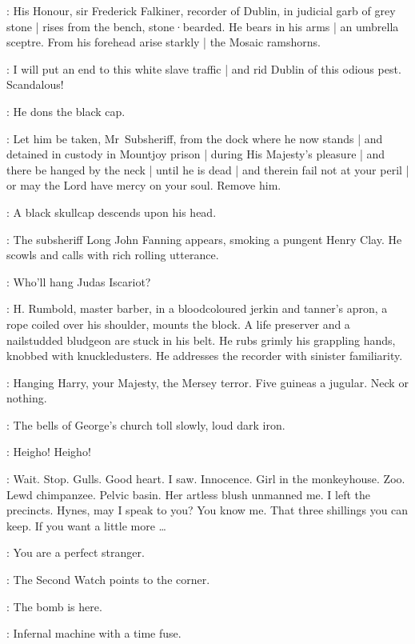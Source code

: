 :
His Honour,
sir Frederick Falkiner,
recorder of Dublin,
in judicial garb of grey stone |
rises from the bench,
stone·bearded.
He bears in his arms |
an umbrella sceptre.
From his forehead arise starkly |
the Mosaic ramshorns.

\Recorder:
I will put an end to this white slave traffic |
and rid Dublin of this odious pest.
Scandalous!

:
He dons the black cap.

\Recorder:
Let him be taken,
Mr~Subsheriff,
from the dock where he now stands |
and detained in custody in Mountjoy prison |
during His Majesty's pleasure |
and there be hanged by the neck |
until he is dead |
and therein fail not at your peril |
or may the Lord have mercy on your soul.
Remove him.

:
A black skullcap descends upon his head.

:
The subsheriff Long John Fanning appears,
smoking a pungent Henry Clay.
He scowls and calls with rich rolling utterance.

\LongJohn:
Who'll hang Judas Iscariot?

:
H.
Rumbold,
master barber,
in a bloodcoloured jerkin and tanner's apron,
a rope coiled over his shoulder,
mounts the block.
A life preserver and a nailstudded bludgeon are stuck in his belt.
He rubs grimly his grappling hands,
knobbed with knuckledusters.
He addresses the recorder with sinister familiarity.

\Rumbold:
Hanging Harry,
your Majesty,
the Mersey terror.
Five guineas a jugular.
Neck or nothing.

:
The bells of George's church toll slowly,
loud dark iron.

\Bells:
Heigho!
Heigho!

\Bloom:
Wait.
Stop.
Gulls.
Good heart.
I saw.
Innocence.
Girl in the monkeyhouse.
Zoo.
Lewd chimpanzee.
Pelvic basin.
Her artless blush unmanned me.
I left the precincts.
Hynes,
may I speak to you?
You know me.
That three shillings you can keep.
If you want a little more \ldots

\Hynes[1]:
You are a perfect stranger.

:
The Second Watch points to the corner.

\SecondWatch:
The bomb is here.

\FirstWatch:
Infernal machine with a time fuse.

